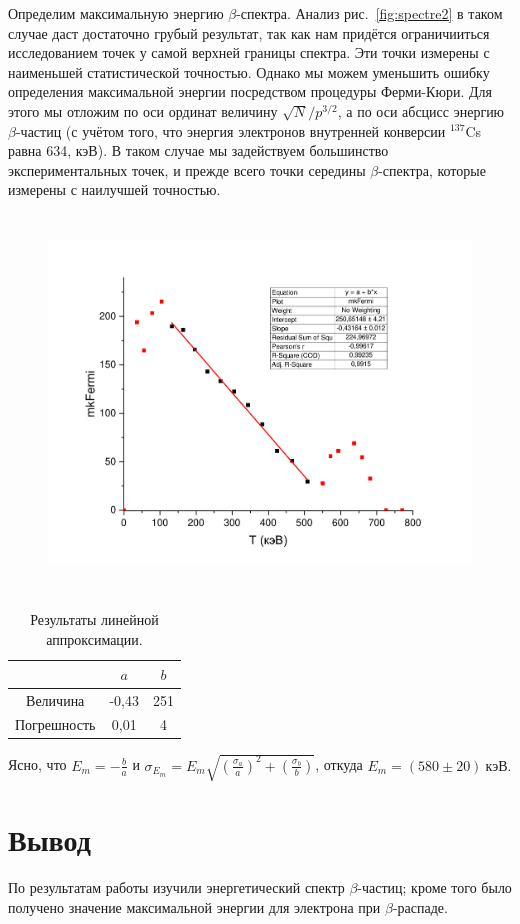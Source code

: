 \documentclass[a4paper,12pt]{article}
\theoremstyle{definition}
\newcommand{\btt}{$\beta $}
\begin{document}
		\newpage
		Определим максимальную энергию $\beta$-спектра. Анализ рис.~\ref{fig:spectre2} в таком случае даст достаточно грубый результат, так как нам придётся ограничииться исследованием точек у самой верхней границы спектра. Эти точки измерены с наименьшей статистической точностью. Однако мы можем уменьшить ошибку определения максимальной энергии посредством процедуры Ферми-Кюри. Для этого мы отложим по оси ординат величину $\sqrt{N}/p^{3/2}$, а по оси абсцисс энергию $\beta$-частиц (с учётом того, что энергия электронов внутренней конверсии $^{137}$Cs равна 634, кэВ). В таком случае мы задействуем большинство экспериментальных точек, и прежде всего точки середины $\beta$-спектра, которые измерены с наилучшей точностью.
		
		\begin{figure}[h!]
			\begin{floatrow}
				{\includegraphics[width=14cm,height=10cm]{Graph2.pdf}}   
			\end{floatrow}
		\end{figure}
	
		\begin{table}[H]
			\caption{Результаты линейной аппроксимации.}
			\label{table:Emax}
			\begin{tabular}{|c|c|c|}
				\hline
				& $a$ & $b$\\ \hline
							Величина    & -0,43                                                        & 251                                                                     \\ \hline
							Погрешность & 0,01                                                         & 4                                                                       \\ \hline
						\end{tabular}
		\end{table}
		Ясно, что $E_m = - \frac{b}{a}$ и $\sigma_{E_m} = E_m \sqrt{\left(\frac{\sigma_a}{a}\right)^2 + \left(\frac{\sigma_b}{b}\right)}$, откуда $E_m =(580 \pm 20) \ \text{кэВ}.$
		
	
	\section{Вывод}
	
	По результатам работы изучили энергетический спектр \btt-частиц; кроме того было получено значение максимальной энергии для электрона при \btt-распаде.
\end{document}
